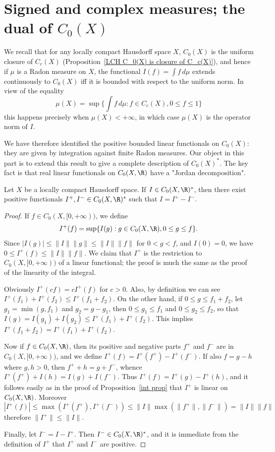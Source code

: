 \section{Signed and complex measures; the dual of \boldmath$C_0(X)$}
We recall that for any locally compact Hausdorff space $X$, $C_0(X)$ is the uniform closure of $C_c(X)$ (Proposition~\ref{LCH C_0(X) is closure of C_c(X)}), and hence if $\mu$ is a Radon measure on $X$, the functional $I(f)=\int f\,d\mu$ extends continuously to $C_0(X)$ iff it is bounded with respect to the uniform norm. In view of the equality
\[\mu(X)=\sup\{\int f\,d\mu:f\in C_c(X),0\leq f\leq 1\}\]
this happens precisely when $\mu(X)<+\infty$, in which case $\mu(X)$ is the operator norm of $I$.\par
We have therefore identified the positive bounded linear functionals on $C_0(X)$: they are given by integration against finite Radon measures. Our object in this part is to extend this result to give a complete description of $C_0(X)^*$. The key fact is that real linear functionals on $C_0(X,\R)$ have a "Jordan decomposition".
\begin{lemma}\label{functional on C_0(X) Jordan decomposition}
Let $X$ be a locally compact Hausdorff space. If $I\in C_0(X,\R)^*$, then there exist positive functionals $I^+,I^-\in C_0(X,\R)^*$ such that $I=I^+-I^-$.
\end{lemma}
\begin{proof}
If $f\in C_0(X,[0,+\infty))$, we define
\[I^+(f)=\sup\{I(g):g\in C_0(X,\R),0\leq g\leq f\}.\]
Since $|I(g)|\leq \|I\|\|g\|\leq\|I\|\|f\|$ for $0<g<f$, and $I(0)=0$, we have $0\leq I^+(f)\leq\|I\|\|f\|$. We claim that $I^+$ is the restriction to $C_0(X,[0,+\infty))$ of a linear functional; the proof is much the same as the proof of the linearity of the integral.\par
Obviously $I^+(cf)=cI^+(f)$ for $c>0$. Also, by definition we can see $I^+(f_1)+I^+(f_2)\leq I^+(f_1+f_2)$. On the other hand, if $0\leq g\leq f_1+f_2$, let $g_1=\min(g,f_1)$ and $g_2=g-g_1$, then $0\leq g_1\leq f_1$ and $0\leq g_2\leq f_2$, so that $I(g)=I(g_1)+I(g_2)\leq I^+(f_1)+I^+(f_2)$. This implies $I^+(f_1+f_2)=I^+(f_1)+I^+(f_2)$.\par
Now if $f\in C_0(X,\R)$, then its positive and negative parts $f^+$ and $f^-$ are in $C_0(X,[0,+\infty))$, and we define $I^+(f)=I^+(f^+)-I^+(f^-)$. If also $f=g-h$ where $g,h>0$, then $f^++h=g+f^-$, whence $I^+(f^+)+I(h)=I(g)+I(f^-)$. Thus $I^+(f)=I^+(g)-I^+(h)$, and it follows easily as in the proof of Proposition~\ref{int prop} that $I^+$ is linear on $C_0(X,\R)$. Moreover
\[|I^+(f)|\leq\max(I^+(f^+),I^+(f^-))\leq\|I\|\max(\|f^+\|,\|f^-\|)=\|I\|\|f\|\]
therefore $\|I^+\|\leq\|I\|$.\par
Finally, let $I^-=I-I^+$. Then $I^-\in C_0(X,\R)^*$, and it is immediate from the definition of $I^+$ that $I^+$ and $I^-$ are positive.
\end{proof}
